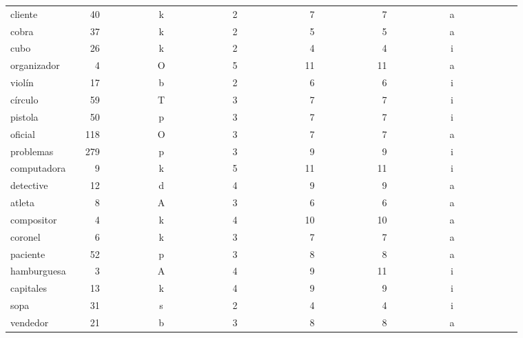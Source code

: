 \begin{longtable}{|l|c|c|c|c|c|c|}
cliente~~~~~~&~40~~~~~~~~~~&k~~~~~~~~~~~~&2~~~~~~~~~~~~&~7~~~~~~~~~~~&~7~~~~~~~~~~~&a~~~~~~~~~~~~\\ 
cobra~~~~~~~~&~37~~~~~~~~~~&k~~~~~~~~~~~~&2~~~~~~~~~~~~&~5~~~~~~~~~~~&~5~~~~~~~~~~~&a~~~~~~~~~~~~\\ 
cubo~~~~~~~~~&~26~~~~~~~~~~&k~~~~~~~~~~~~&2~~~~~~~~~~~~&~4~~~~~~~~~~~&~4~~~~~~~~~~~&i~~~~~~~~~~~~\\ 
organizador~~&~~4~~~~~~~~~~&O~~~~~~~~~~~~&5~~~~~~~~~~~~&11~~~~~~~~~~~&11~~~~~~~~~~~&a~~~~~~~~~~~~\\ 
viol\'{i}n~~~~~~~&~17~~~~~~~~~~&b~~~~~~~~~~~~&2~~~~~~~~~~~~&~6~~~~~~~~~~~&~6~~~~~~~~~~~&i~~~~~~~~~~~~\\ 
c\'{i}rculo~~~~~~&~59~~~~~~~~~~&T~~~~~~~~~~~~&3~~~~~~~~~~~~&~7~~~~~~~~~~~&~7~~~~~~~~~~~&i~~~~~~~~~~~~\\ 
pistola~~~~~~&~50~~~~~~~~~~&p~~~~~~~~~~~~&3~~~~~~~~~~~~&~7~~~~~~~~~~~&~7~~~~~~~~~~~&i~~~~~~~~~~~~\\ 
oficial~~~~~~&118~~~~~~~~~~&O~~~~~~~~~~~~&3~~~~~~~~~~~~&~7~~~~~~~~~~~&~7~~~~~~~~~~~&a~~~~~~~~~~~~\\ 
problemas~~~~&279~~~~~~~~~~&p~~~~~~~~~~~~&3~~~~~~~~~~~~&~9~~~~~~~~~~~&~9~~~~~~~~~~~&i~~~~~~~~~~~~\\ 
computadora~~&~~9~~~~~~~~~~&k~~~~~~~~~~~~&5~~~~~~~~~~~~&11~~~~~~~~~~~&11~~~~~~~~~~~&i~~~~~~~~~~~~\\ 
detective~~~~&~12~~~~~~~~~~&d~~~~~~~~~~~~&4~~~~~~~~~~~~&~9~~~~~~~~~~~&~9~~~~~~~~~~~&a~~~~~~~~~~~~\\ 
atleta~~~~~~~&~~8~~~~~~~~~~&A~~~~~~~~~~~~&3~~~~~~~~~~~~&~6~~~~~~~~~~~&~6~~~~~~~~~~~&a~~~~~~~~~~~~\\ 
compositor~~~&~~4~~~~~~~~~~&k~~~~~~~~~~~~&4~~~~~~~~~~~~&10~~~~~~~~~~~&10~~~~~~~~~~~&a~~~~~~~~~~~~\\ 
coronel~~~~~~&~~6~~~~~~~~~~&k~~~~~~~~~~~~&3~~~~~~~~~~~~&~7~~~~~~~~~~~&~7~~~~~~~~~~~&a~~~~~~~~~~~~\\ 
paciente~~~~~&~52~~~~~~~~~~&p~~~~~~~~~~~~&3~~~~~~~~~~~~&~8~~~~~~~~~~~&~8~~~~~~~~~~~&a~~~~~~~~~~~~\\ 
hamburguesa~~&~~3~~~~~~~~~~&A~~~~~~~~~~~~&4~~~~~~~~~~~~&~9~~~~~~~~~~~&11~~~~~~~~~~~&i~~~~~~~~~~~~\\ 
capitales~~~~&~13~~~~~~~~~~&k~~~~~~~~~~~~&4~~~~~~~~~~~~&~9~~~~~~~~~~~&~9~~~~~~~~~~~&i~~~~~~~~~~~~\\ 
sopa~~~~~~~~~&~31~~~~~~~~~~&s~~~~~~~~~~~~&2~~~~~~~~~~~~&~4~~~~~~~~~~~&~4~~~~~~~~~~~&i~~~~~~~~~~~~\\ 
vendedor~~~~~&~21~~~~~~~~~~&b~~~~~~~~~~~~&3~~~~~~~~~~~~&~8~~~~~~~~~~~&~8~~~~~~~~~~~&a~~~~~~~~~~~~\\ 

\end{longtable}
